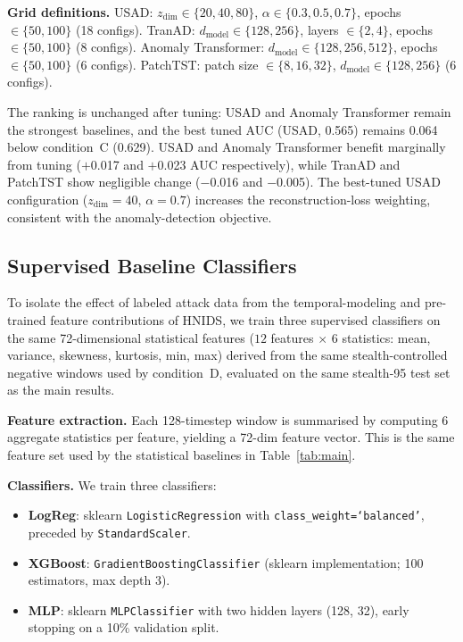 \textbf{Grid definitions.}
USAD: $z_\text{dim} \in \{20, 40, 80\}$, $\alpha \in \{0.3, 0.5, 0.7\}$,
epochs $\in \{50, 100\}$ (18 configs).
TranAD: $d_\text{model} \in \{128, 256\}$, layers $\in \{2, 4\}$,
epochs $\in \{50, 100\}$ (8 configs).
Anomaly Transformer: $d_\text{model} \in \{128, 256, 512\}$,
epochs $\in \{50, 100\}$ (6 configs).
PatchTST: patch size $\in \{8, 16, 32\}$,
$d_\text{model} \in \{128, 256\}$ (6 configs).

The ranking is unchanged after tuning: USAD and Anomaly Transformer remain
the strongest baselines, and the best tuned AUC (USAD, 0.565) remains
0.064 below \ours{} condition~C (0.629).
USAD and Anomaly Transformer benefit marginally from tuning
($+$0.017 and $+$0.023 AUC respectively), while TranAD and PatchTST
show negligible change ($-$0.016 and $-$0.005).
The best-tuned USAD configuration ($z_\text{dim}{=}40$, $\alpha{=}0.7$)
increases the reconstruction-loss weighting, consistent with the
anomaly-detection objective.

\subsection{Supervised Baseline Classifiers}
\label{app:supervised_baselines}

To isolate the effect of labeled attack data from the temporal-modeling and
pre-trained feature contributions of HNIDS, we train three supervised
classifiers on the same 72-dimensional statistical features ($12$ features
$\times$ $6$ statistics: mean, variance, skewness, kurtosis, min, max)
derived from the same stealth-controlled negative windows used by
condition~D, evaluated on the same stealth-95 test set as the main results.

\textbf{Feature extraction.}
Each 128-timestep window is summarised by computing 6 aggregate statistics
per feature, yielding a 72-dim feature vector.
This is the same feature set used by the statistical baselines
in Table~\ref{tab:main}.

\textbf{Classifiers.}
We train three classifiers:
\begin{itemize}
  \item \textbf{LogReg}: sklearn \texttt{LogisticRegression} with
    \texttt{class\_weight=`balanced'}, preceded by \texttt{StandardScaler}.
  \item \textbf{XGBoost}: \texttt{GradientBoostingClassifier}
    (sklearn implementation; 100 estimators, max depth 3).
  \item \textbf{MLP}: sklearn \texttt{MLPClassifier}
    with two hidden layers (128, 32), early stopping on a 10\% validation split.
\end{itemize}

